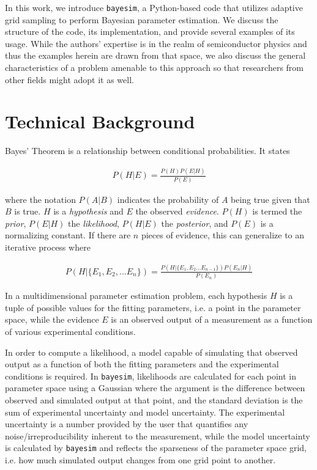 \documentclass[aps,prl,amsmath,amssymb,superscriptaddress,notitlepage,groupedaddress]{revtex4-1}
\begin{document}
  In this work, we introduce \texttt{bayesim}, a Python-based code that utilizes adaptive grid sampling to perform Bayesian parameter estimation. We discuss the structure of the code, its implementation, and provide several examples of its usage. While the authors' expertise is in the realm of semiconductor physics and thus the examples herein are drawn from that space, we also discuss the general characteristics of a problem amenable to this approach so that researchers from other fields might adopt it as well.

\section*{Technical Background}

 Bayes' Theorem is a relationship between conditional probabilities. It states

 \begin{equation}
   \begin{split}
     \label{Eq:1001}
     P(H|E)=\frac{P(H)P(E|H)}{P(E)}
   \end{split}
 \end{equation}

 where the notation $P(A|B)$ indicates the probability of $A$ being true given that $B$ is true. $H$ is a \textit{hypothesis} and $E$ the observed \textit{evidence}. $P(H)$ is termed the \textit{prior}, $P(E|H)$ the \textit{likelihood}, $P(H|E)$ the \textit{posterior}, and $P(E)$ is a normalizing constant. If there are $n$ pieces of evidence, this can generalize to an iterative process where

 \begin{equation}
   \begin{split}
     \label{Eq:2}
     P(H|\{E_1,E_2,...E_n\}) = \frac{P(H|\{E_1,E_2...E_{n-1}\})P(E_n|H)}{P(E_n)}
   \end{split}
 \end{equation}

 In a multidimensional parameter estimation problem, each hypothesis $H$ is a tuple of possible values for the fitting parameters, i.e. a point in the parameter space, while the evidence $E$ is an observed output of a measurement as a function of various experimental conditions.

 In order to compute a likelihood, a model capable of simulating that observed output as a function of both the fitting parameters and the experimental conditions is required. In \texttt{bayesim}, likelihoods are calculated for each point in parameter space using a Gaussian where the argument is the difference between observed and simulated output at that point, and the standard deviation is the sum of experimental uncertainty and model uncertainty. The experimental uncertainty is a number provided by the user that quantifies any noise/irreproducibility inherent to the measurement, while the model uncertainty is calculated by \texttt{bayesim} and reflects the sparseness of the parameter space grid, i.e. how much simulated output changes from one grid point to another.
\end{document}
